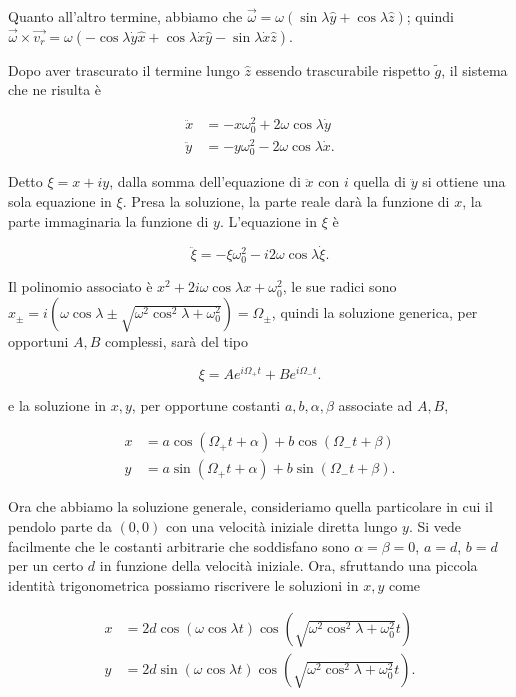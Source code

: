 \documentclass[../main.tex]{subfiles}
\begin{document}
Quanto all'altro termine, abbiamo che $\vec{\omega}=\omega (\sin \lambda \hat{y} + \cos \lambda \hat{z})$; quindi
$\vec{\omega}\times\vec{v_r} = \omega (-\cos \lambda \dot{y}\hat{x} + \cos \lambda \dot{x}\hat{y} - \sin \lambda \dot{x} \hat{z})$.

Dopo aver trascurato il termine lungo $\hat{z}$ essendo trascurabile rispetto $\tilde{g}$, il sistema che ne risulta è

\begin{align*}
	\ddot{x} &=  -x\omega^2_0 +2\omega\cos \lambda \dot{y}\\
	\ddot{y} &=  -y\omega^2_0 -2\omega\cos \lambda \dot{x}.
\end{align*}

Detto $\xi = x + iy$, dalla somma dell'equazione di $\ddot{x}$ con $i$ quella di $\ddot{y}$ si ottiene una sola equazione in $\xi$.
Presa la soluzione, la parte reale darà la funzione di $x$, la parte immaginaria la funzione di $y$.
L'equazione in $\xi$ è

\begin{equation}
 \label{pf:xieq}
  \ddot{\xi} = -\xi \omega^2_0 - i 2\omega\cos \lambda \dot{\xi}.
\end{equation}

Il polinomio associato è $x^2 + 2i\omega\cos\lambda x + \omega^2_0$, le sue radici sono
$ x_{\pm} = i\left(\omega\cos\lambda \pm \sqrt{\omega^2\cos^2 \lambda + \omega^2_0} \right) = \Omega_{\pm}$,
quindi la soluzione generica, per opportuni $A,B$ complessi, sarà del tipo

\[
  \xi = Ae^{i\Omega_+ t} + Be^{i\Omega_-t}.
\]

e la soluzione in $x,y$, per opportune costanti $a,b,\alpha,\beta$ associate ad $A,B$,

\begin{align*}
	x &=  a\cos(\Omega_+ t + \alpha) + b\cos(\Omega_- t + \beta)\\
	y &=  a\sin(\Omega_+ t + \alpha) + b\sin(\Omega_- t + \beta).
\end{align*}

Ora che abbiamo la soluzione generale, consideriamo quella particolare in cui il pendolo parte da $(0,0)$ con una velocità iniziale diretta
lungo $y$. Si vede facilmente che le costanti arbitrarie che soddisfano sono $\alpha=\beta=0$, $a=d$, $b=d$
per un certo $d$ in funzione della velocità iniziale.
Ora, sfruttando una piccola identità trigonometrica possiamo riscrivere le soluzioni in $x,y$ come

\begin{align*}
	x &=  2d\cos(\omega\cos\lambda t)\cos\left(\sqrt{\omega^2\cos^2 \lambda + \omega^2_0} t\right)\\
	y &=  2d\sin(\omega\cos\lambda t)\cos\left(\sqrt{\omega^2\cos^2 \lambda + \omega^2_0} t\right).
\end{align*}
\end{document}
